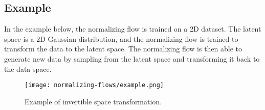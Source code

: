 \subsection{Example}
In the example below, the normalizing flow is trained on a 2D dataset. The latent space is a 2D Gaussian distribution, and the normalizing flow is trained to transform the data to the latent space. The normalizing flow is then able to generate new data by sampling from the latent space and transforming it back to the data space.
\begin{figure}[H]
    \centering
    \texttt{[image: normalizing-flows/example.png]}
    \caption{Example of invertible space transformation.}
\end{figure}
